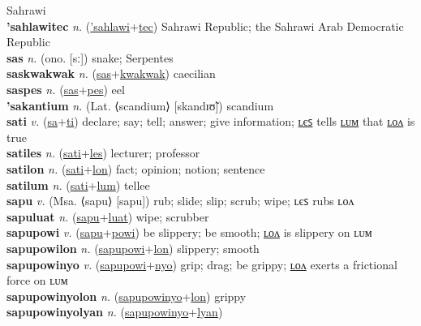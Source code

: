 Sahrawi \label{'sahlawiak} \\
\textbf{'sahlawitec} \textit{n.} (\hyperref['sahlawi]{'sahlawi}+\hyperref[tec]{tec})
Sahrawi Republic; the Sahrawi Arab Democratic Republic \label{'sahlawitec} \\
\textbf{sas} \textit{n.} (ono. [sː])
snake; Serpentes \label{sas} \\
\textbf{saskwakwak} \textit{n.} (\hyperref[sas]{sas}+\hyperref[kwakwak]{kwakwak})
caecilian \label{saskwakwak} \\
\textbf{saspes} \textit{n.} (\hyperref[sas]{sas}+\hyperref[pes]{pes})
eel \label{saspes} \\
\textbf{'sakantium} \textit{n.} (Lat. ⟨scandium⟩ [skandɪʊ̃])
scandium \label{'sakantium} \\
\textbf{sati} \textit{v.} (\hyperref[sa]{sa}+\hyperref[ti]{ti})
declare; say; tell; answer; give information; \hyperref[satiles]{ʟєꜱ} tells \hyperref[satilum]{ʟᴜᴍ} that \hyperref[satilon]{ʟᴏᴧ} is true \label{sati} \\
\textbf{satiles} \textit{n.} (\hyperref[sati]{sati}+\hyperref[les]{les})
lecturer; professor \label{satiles} \\
\textbf{satilon} \textit{n.} (\hyperref[sati]{sati}+\hyperref[lon]{lon})
fact; opinion; notion; sentence \label{satilon} \\
\textbf{satilum} \textit{n.} (\hyperref[sati]{sati}+\hyperref[lum]{lum})
tellee \label{satilum} \\
\textbf{sapu} \textit{v.} (Msa. ⟨sapu⟩ [sapu])
rub; slide; slip; scrub; wipe; ʟєꜱ rubs ʟᴏᴧ \label{sapu} \\
\textbf{sapuluat} \textit{n.} (\hyperref[sapu]{sapu}+\hyperref[luat]{luat})
wipe; scrubber \label{sapuluat} \\
\textbf{sapupowi} \textit{v.} (\hyperref[sapu]{sapu}+\hyperref[powi]{powi})
be slippery; be smooth; \hyperref[sapupowilon]{ʟᴏᴧ} is slippery on ʟᴜᴍ \label{sapupowi} \\
\textbf{sapupowilon} \textit{n.} (\hyperref[sapupowi]{sapupowi}+\hyperref[lon]{lon})
slippery; smooth \label{sapupowilon} \\
\textbf{sapupowinyo} \textit{v.} (\hyperref[sapupowi]{sapupowi}+\hyperref[nyo]{nyo})
grip; drag; be grippy; \hyperref[sapupowinyolon]{ʟᴏᴧ} exerts a frictional force on ʟᴜᴍ \label{sapupowinyo} \\
\textbf{sapupowinyolon} \textit{n.} (\hyperref[sapupowinyo]{sapupowinyo}+\hyperref[lon]{lon})
grippy \label{sapupowinyolon} \\
\textbf{sapupowinyolyan} \textit{n.} (\hyperref[sapupowinyo]{sapupowinyo}+\hyperref[lyan]{lyan})
